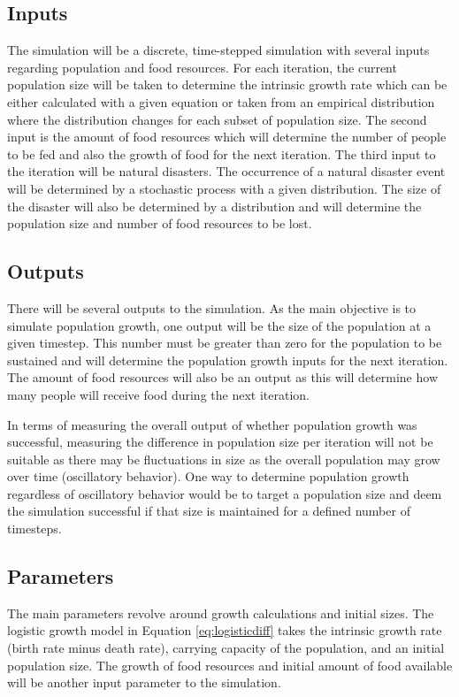 \documentclass[12pt]{article}
\begin{document}
\subsection{Inputs}
The simulation will be a discrete, time-stepped simulation with several inputs regarding population and food resources. For each iteration, the current population size will be taken to determine the intrinsic growth rate which can be either calculated with a given equation or taken from an empirical distribution where the distribution changes for each subset of population size.  The second input is the amount of food resources which will determine the number of people to be fed and also the growth of food for the next iteration.  The third input to the iteration will be natural disasters. The occurrence of a natural disaster event will be determined by a stochastic process with a given distribution.  The size of the disaster will also be determined by a distribution and will determine the population size and number of food resources to be lost.

\subsection{Outputs}
There will be several outputs to the simulation.  As the main objective is to simulate population growth, one output will be the size of the population at a given timestep.  This number must be greater than zero for the population to be sustained and will determine the population growth inputs for the next iteration.  The amount of food resources will also be an output as this will determine how many people will receive food during the next iteration.

In terms of measuring the overall output of whether population growth was successful, measuring the difference in population size per iteration will not be suitable as there may be fluctuations in size as the overall population may grow over time (oscillatory behavior). One way to determine population growth regardless of oscillatory behavior would be to target a population size and deem the simulation successful if that size is maintained for a defined number of timesteps.

\subsection{Parameters}

The main parameters revolve around growth calculations and initial sizes.
The logistic growth model in Equation \ref{eq:logisticdiff} takes the intrinsic
growth rate (birth rate minus death rate), carrying capacity of the population,
and an initial population size.  The growth of food resources and initial amount of food available will be another input parameter to the simulation.  
\end{document}
